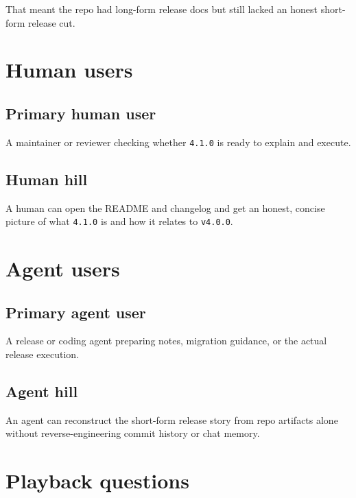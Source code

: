 That meant the repo had long-form release docs but still lacked an honest short-form release cut.

\section{Human users}\label{record-204-human-users}

\subsection{Primary human user}\label{record-204-primary-human-user}

A maintainer or reviewer checking whether \texttt{4\allowbreak{}.\allowbreak{}1\allowbreak{}.\allowbreak{}0} is ready to explain and execute.

\subsection{Human hill}\label{record-204-human-hill}

A human can open the README and changelog and get an honest, concise picture of what \texttt{4\allowbreak{}.\allowbreak{}1\allowbreak{}.\allowbreak{}0} is and how it relates to \texttt{v\allowbreak{}4\allowbreak{}.\allowbreak{}0\allowbreak{}.\allowbreak{}0}.

\section{Agent users}\label{record-204-agent-users}

\subsection{Primary agent user}\label{record-204-primary-agent-user}

A release or coding agent preparing notes, migration guidance, or the actual release execution.

\subsection{Agent hill}\label{record-204-agent-hill}

An agent can reconstruct the short-form release story from repo artifacts alone without reverse-engineering commit history or chat memory.

\section{Playback questions}\label{record-204-playback-questions}

